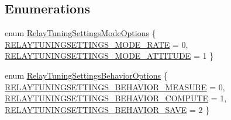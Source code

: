 \subsection*{\-Enumerations}
\begin{DoxyCompactItemize}
\item 
enum \hyperlink{group___relay_tuning_settings_gaa78cd598f67300dad2d46f51c9610052}{\-Relay\-Tuning\-Settings\-Mode\-Options} \{ \hyperlink{group___relay_tuning_settings_ggaa78cd598f67300dad2d46f51c9610052ab332923fb7c61fd4fa838fd93b5162af}{\-R\-E\-L\-A\-Y\-T\-U\-N\-I\-N\-G\-S\-E\-T\-T\-I\-N\-G\-S\-\_\-\-M\-O\-D\-E\-\_\-\-R\-A\-T\-E} = 0, 
\hyperlink{group___relay_tuning_settings_ggaa78cd598f67300dad2d46f51c9610052ae91a02bdc9c99101d636aa735e9cac34}{\-R\-E\-L\-A\-Y\-T\-U\-N\-I\-N\-G\-S\-E\-T\-T\-I\-N\-G\-S\-\_\-\-M\-O\-D\-E\-\_\-\-A\-T\-T\-I\-T\-U\-D\-E} = 1
 \}
\item 
enum \hyperlink{group___relay_tuning_settings_gacd6c5007499dbec8298a472470397171}{\-Relay\-Tuning\-Settings\-Behavior\-Options} \{ \hyperlink{group___relay_tuning_settings_ggacd6c5007499dbec8298a472470397171aa8d2a98b0711e00acaca5b6f0040f817}{\-R\-E\-L\-A\-Y\-T\-U\-N\-I\-N\-G\-S\-E\-T\-T\-I\-N\-G\-S\-\_\-\-B\-E\-H\-A\-V\-I\-O\-R\-\_\-\-M\-E\-A\-S\-U\-R\-E} = 0, 
\hyperlink{group___relay_tuning_settings_ggacd6c5007499dbec8298a472470397171ab041305b34d6e64064689a061995a16a}{\-R\-E\-L\-A\-Y\-T\-U\-N\-I\-N\-G\-S\-E\-T\-T\-I\-N\-G\-S\-\_\-\-B\-E\-H\-A\-V\-I\-O\-R\-\_\-\-C\-O\-M\-P\-U\-T\-E} = 1, 
\hyperlink{group___relay_tuning_settings_ggacd6c5007499dbec8298a472470397171a7a434203ad34a359ed9a03274e7d4e51}{\-R\-E\-L\-A\-Y\-T\-U\-N\-I\-N\-G\-S\-E\-T\-T\-I\-N\-G\-S\-\_\-\-B\-E\-H\-A\-V\-I\-O\-R\-\_\-\-S\-A\-V\-E} = 2
 \}
\end{DoxyCompactItemize}
